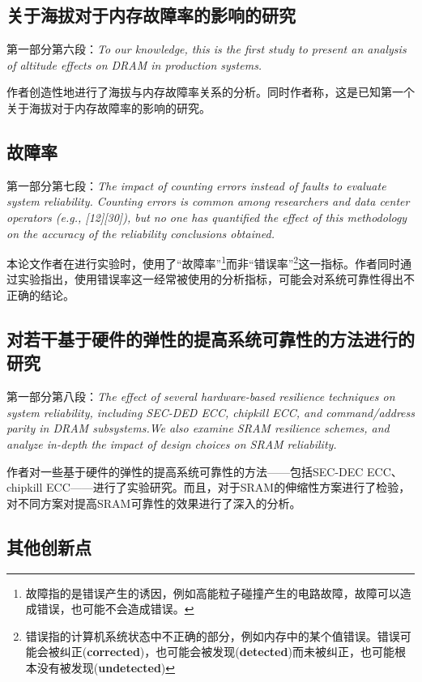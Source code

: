 \documentclass[11pt, a4paper]{article}
\begin{document}
\subsection{关于海拔对于内存故障率的影响的研究}

第一部分第六段：\emph{To our knowledge, this is the first study to present an analysis of altitude effects on DRAM in production systems.}

作者创造性地进行了海拔与内存故障率关系的分析。同时作者称，这是已知第一个关于海拔对于内存故障率的影响的研究。

\subsection{故障率}

第一部分第七段：\emph{The impact of counting errors instead of faults to evaluate system reliability. Counting errors is common among researchers and data center operators (e.g., [12][30]), but no one has quantified the effect of this methodology on the accuracy of the reliability conclusions obtained.}

本论文作者在进行实验时，使用了“故障率”\footnote{故障指的是错误产生的诱因，例如高能粒子碰撞产生的电路故障，故障可以造成错误，也可能不会造成错误。}而非“错误率”\footnote{错误指的计算机系统状态中不正确的部分，例如内存中的某个值错误。错误可能会被纠正({\bf corrected})，也可能会被发现({\bf detected})而未被纠正，也可能根本没有被发现({\bf undetected})}这一指标。作者同时通过实验指出，使用错误率这一经常被使用的分析指标，可能会对系统可靠性得出不正确的结论。

\subsection{对若干基于硬件的弹性的提高系统可靠性的方法进行的研究}

第一部分第八段：\emph{The effect of several hardware-based resilience techniques on system reliability, including SEC-DED ECC, chipkill ECC, and command/address parity in DRAM subsystems.We also examine SRAM resilience schemes, and analyze in-depth the impact of design choices on SRAM reliability.}

作者对一些基于硬件的弹性的提高系统可靠性的方法——包括SEC-DEC ECC、chipkill ECC——进行了实验研究。而且，对于SRAM的伸缩性方案进行了检验，对不同方案对提高SRAM可靠性的效果进行了深入的分析。

\subsection{其他创新点}
\end{document}
